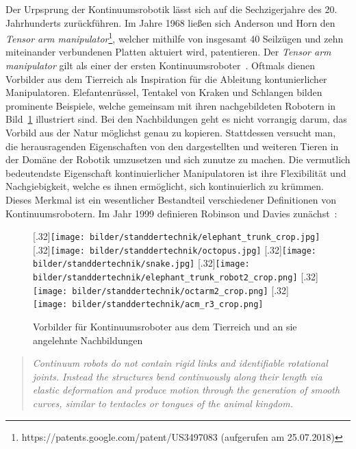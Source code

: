 Der Urpsprung der Kontinuumsrobotik lässt sich auf die Sechzigerjahre des 20. Jahrhunderts zurückführen. Im Jahre 1968 ließen sich Anderson und Horn den \textit{Tensor arm manipulator}\footnote{https://patents.google.com/patent/US3497083 (aufgerufen am 25.07.2018)}, welcher mithilfe von insgesamt 40 Seilzügen und zehn miteinander verbundenen Platten aktuiert wird, patentieren. Der \textit{Tensor arm manipulator} gilt als einer der ersten Kontinuumsroboter~\cite{Wal13}. Oftmals dienen Vorbilder aus dem Tierreich als Inspiration für die Ableitung kontunierlicher Manipulatoren. Elefantenrüssel, Tentakel von Kraken und Schlangen bilden prominente Beispiele, welche gemeinsam mit ihren nachgebildeten Robotern in Bild~\ref{fig:tiereUndRoboter} illustriert sind. Bei den Nachbildungen geht es nicht vorrangig darum, das Vorbild aus der Natur möglichst genau zu kopieren. Stattdessen versucht man, die herausragenden Eigenschaften von den dargestellten und weiteren Tieren in der Domäne der Robotik umzusetzen und sich zunutze zu machen. Die vermutlich bedeutendste Eigenschaft kontinuierlicher Manipulatoren ist ihre Flexibilität und Nachgiebigkeit, welche es ihnen ermöglicht, sich kontinuierlich zu krümmen. Dieses Merkmal ist ein wesentlicher Bestandteil verschiedener Definitionen von Kontinuumsrobotern. Im Jahr 1999 definieren Robinson und Davies zunächst~\cite{RD99}:
%
\begin{figure}[t]
\centering
{}%
[.32\linewidth]{\texttt{[image: bilder/standdertechnik/elephant\_trunk\_crop.jpg]}}
%
[.32\linewidth]{\texttt{[image: bilder/standdertechnik/octopus.jpg]}}
[.32\linewidth]{\texttt{[image: bilder/standdertechnik/snake.jpg]}}
\medskip
{}%
[.32\linewidth]{\texttt{[image: bilder/standdertechnik/elephant\_trunk\_robot2\_crop.png]}}
%
[.32\linewidth]{\texttt{[image: bilder/standdertechnik/octarm2\_crop.png]}}
[.32\linewidth]{\texttt{[image: bilder/standdertechnik/acm\_r3\_crop.png]}}
\caption[Vorbilder für Kontinuumsroboter aus dem Tierreich und an sie angelehnte Nachbildungen]{Vorbilder für Kontinuumsroboter aus dem Tierreich und an sie angelehnte Nachbildungen}
\label{fig:tiereUndRoboter}
\end{figure}

\begin{quotation}
\textit{Continuum robots do not contain rigid links and identifiable rotational joints. Instead the structures bend continuously along their length via elastic deformation and produce motion through the generation of smooth curves, similar to tentacles or tongues of the animal kingdom.}
\end{quotation}

